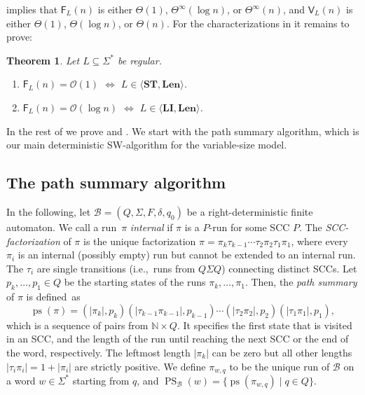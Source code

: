 \documentclass{article}\usepackage[a4paper,margin=20mm]{geometry}
\newtheorem{theorem}{Theorem}\newtheorem{lemma}[theorem]{Lemma}\newtheorem{proposition}[theorem]{Proposition}\newtheorem{corollary}[theorem]{Corollary}\newtheorem{definition}[theorem]{Definition}\newtheorem{claim}[theorem]{Claim}\newtheorem{remark}[theorem]{Remark}\newtheorem{observation}[theorem]{Observation}\newtheorem{conjecture}[theorem]{Conjecture}\newtheorem{example}[theorem]{Example}
\newcommand{\N}{\mathbb{N}}
\newcommand{\B}{\mathcal{B}}
\renewcommand{\O}{\mathcal{O}}
\newcommand{\F}{\mathsf{F}}
\newcommand{\V}{\mathsf{V}}
\DeclareMathOperator{\ps}{ps}
\DeclareMathOperator{\PS}{PS}
\newcommand{\Len}{\mathbf{Len}}
\newcommand{\LI}{\mathbf{LI}}
\newcommand{\ST}{\mathbf{ST}}
\newcommand{\Thetainf}{\Theta^{\scriptscriptstyle{\infty}}}
\begin{document}
 implies that 
$\F_L(n)$ is either $\Theta(1)$, $\Thetainf(\log n)$, or $\Thetainf(n)$,
and 
$\V_L(n)$ is either $\Theta(1)$, $\Theta(\log n)$, or $\Theta(n)$.
For the characterizations in  it remains to prove:

\begin{theorem}
	\label{thm:characterization}
	Let $L \subseteq \Sigma^*$ be regular.
	\begin{enumerate}[label=(\roman{*}), ref=(\roman{*})]
		\item $\F_L(n) = \O(1)$ $\iff$ $L \in \langle \ST, \Len \rangle$.
		\label{item:const}
		\item $\F_L(n) = \O(\log n)$ $\iff$ $L \in \langle \LI, \Len \rangle$.
		\label{item:log}
	\end{enumerate}	
\end{theorem}
In the rest of  we prove  and .
We start with the path summary algorithm, which is our main deterministic SW-algorithm for the variable-size model.

\subsection{The path summary algorithm}

\label{subsec:pathsummary}


In the following, let $\B = (Q,\Sigma,F,\delta,q_0)$ be a right-deterministic finite automaton.
We call a run~$\pi$ {\em internal} if $\pi$ is a $P$-run for some SCC $P$.
The {\em SCC-factorization} of $\pi$ is the unique factorization
$\pi = \pi_k \tau_{k-1} \cdots \tau_2 \pi_2 \tau_1 \pi_1$, where every $\pi_i$ is an internal
(possibly empty) run but cannot be extended to an internal run. The $\tau_i$ are single transitions
(i.e.,~runs from $Q \Sigma Q$) connecting distinct SCCs.
Let $p_k, \dots, p_1 \in Q$ be the starting states of the runs $\pi_k, \dots, \pi_1$.
Then, the {\em path summary} of $\pi$ is defined~as
\[
	\ps(\pi) = (|\pi_k|,p_k) (|\tau_{k-1} \pi_{k-1}|,p_{k-1}) \cdots (|\tau_2 \pi_2|,p_2) (|\tau_1 \pi_1|,p_1),
\]
which is a sequence of pairs from $\N \times Q$.
It specifies the first state that is visited in an SCC,
and the length of the run until reaching the next SCC or the end of the word, respectively.
The leftmost length $|\pi_k|$ can be zero but all other lengths $|\tau_i \pi_i| = 1+|\pi_i|$ are strictly positive.
We define $\pi_{w,q}$ to be the unique run of $\B$ on a word $w \in \Sigma^*$ starting from $q$,
and $\PS_\B(w) = \{\ps(\pi_{w,q}) \mid q \in Q\}$.
\end{document}
